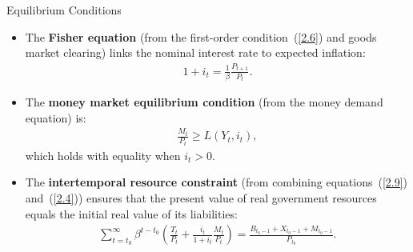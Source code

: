 \documentclass[11pt,aspectratio=169]{beamer}
\begin{document}
\begin{frame}{Equilibrium Conditions}
\small
\begin{itemize}

    \item The \textbf{Fisher equation} (from the first-order condition~(\ref{2.6}) and goods market clearing) links the nominal interest rate to expected inflation:
    \begin{align}
        1+i_t = \frac{1}{\beta}\frac{P_{t+1}}{P_t}.
        \label{2.20}
    \end{align}

    \item The \textbf{money market equilibrium condition} (from the money demand equation) is:
    \begin{align}
        \frac{M_t}{P_t} \ge L(Y_t, i_t),
        \label{2.21}
    \end{align}
    which holds with equality when $i_t > 0$.

    \item The \textbf{intertemporal resource constraint} (from combining equations~(\ref{2.9}) and~(\ref{2.4})) ensures that the present value of real government resources equals the initial real value of its liabilities:
    \begin{align}
        \sum_{t=t_0}^\infty \beta^{t-t_0}
        \left(
            \frac{T_t}{P_t} + \frac{i_t}{1+i_t}\frac{M_t}{P_t}
        \right)
        = 
        \frac{B_{t_0-1}+X_{t_0-1}+M_{t_0-1}}{P_{t_0}}.
        \label{2.22}
    \end{align}

\end{itemize}
\end{frame}
\end{document}
